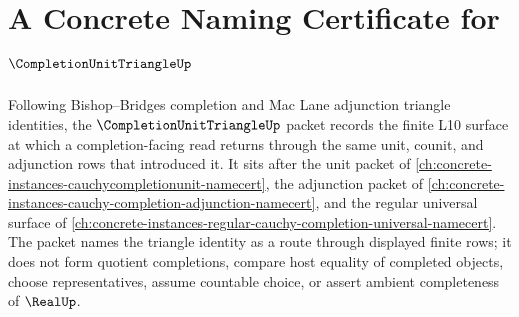 \chapter{A Concrete Naming Certificate for $\CompletionUnitTriangleUp$}
\label{ch:concrete-instances-completion-unit-triangle-namecert}

Following Bishop--Bridges completion and Mac Lane adjunction triangle identities, the $\CompletionUnitTriangleUp$ packet records the finite L10 surface at which a completion-facing read returns through the same unit, counit, and adjunction rows that introduced it. It sits after the unit packet of \autoref{ch:concrete-instances-cauchycompletionunit-namecert}, the adjunction packet of \autoref{ch:concrete-instances-cauchy-completion-adjunction-namecert}, and the regular universal surface of \autoref{ch:concrete-instances-regular-cauchy-completion-universal-namecert}. The packet names the triangle identity as a route through displayed finite rows; it does not form quotient completions, compare host equality of completed objects, choose representatives, assume countable choice, or assert ambient completeness of $\RealUp$.

